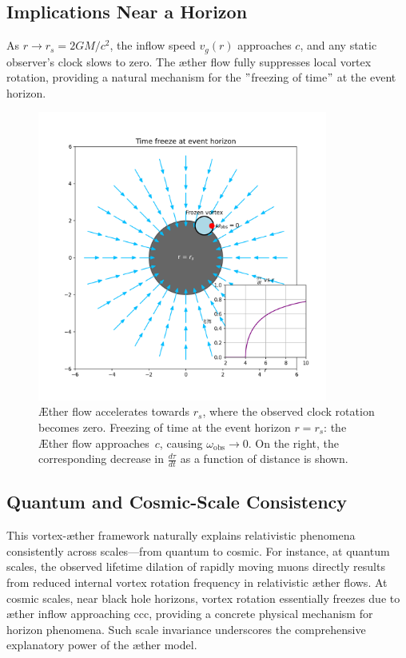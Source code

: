 \subsection*{Implications Near a Horizon}

As $r \to r_s = 2GM/c^2$, the inflow speed $v_g(r)$ approaches $c$, and any static observer's clock slows to zero. The æther flow fully suppresses local vortex rotation, providing a natural mechanism for the \("\)freezing of time\("\) at the event horizon.

\begin{figure}[htbp]
    \centering
    \includegraphics[width=0.85\textwidth]{images/10-HorizonTijdsbevriezing}
    \caption{Æther flow accelerates towards $r_s$, where the observed clock rotation becomes zero. Freezing of time at the event horizon $r = r_s$: the Æther flow approaches~$c$, causing $\omega_{\mathrm{obs}} \to 0$. On the right, the corresponding decrease in $\frac{d\tau}{dt}$ as a function of distance is shown.}
    \label{fig:HorizonTijdsbevriezing}
\end{figure}


\subsection*{Quantum and Cosmic-Scale Consistency}

This vortex-æther framework naturally explains relativistic phenomena consistently across scales—from quantum to cosmic. For instance, at quantum scales, the observed lifetime dilation of rapidly moving muons directly results from reduced internal vortex rotation frequency in relativistic æther flows. At cosmic scales, near black hole horizons, vortex rotation essentially freezes due to æther inflow approaching ccc, providing a concrete physical mechanism for horizon phenomena. Such scale invariance underscores the comprehensive explanatory power of the æther model.

